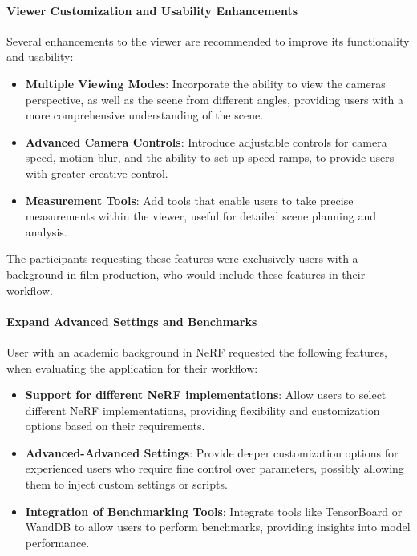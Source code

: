 \paragraph{Viewer Customization and Usability Enhancements}
Several enhancements to the viewer are recommended to improve its functionality and usability:

\begin{itemize}
  \item \textbf{Multiple Viewing Modes}: Incorporate the ability to view the cameras perspective, as well as the scene from different angles, providing users with a more comprehensive understanding of the scene.
  \item \textbf{Advanced Camera Controls}: Introduce adjustable controls for camera speed, motion blur, and the ability to set up speed ramps, to provide users with greater creative control.
  \item \textbf{Measurement Tools}: Add tools that enable users to take precise measurements within the viewer, useful for detailed scene planning and analysis.
\end{itemize}

The participants requesting these features were exclusively users with a background in film production, who would include these features in their workflow.

\paragraph{Expand Advanced Settings and Benchmarks}
User with an academic background in NeRF requested the following features, when evaluating the application for their workflow:

\begin{itemize}
  \item \textbf{Support for different NeRF implementations}: Allow users to select different NeRF implementations, providing flexibility and customization options based on their requirements.
  \item \textbf{Advanced-Advanced Settings}: Provide deeper customization options for experienced users who require fine control over parameters, possibly allowing them to inject custom settings or scripts.
  \item \textbf{Integration of Benchmarking Tools}: Integrate tools like TensorBoard or WandDB to allow users to perform benchmarks, providing insights into model performance.
\end{itemize}



